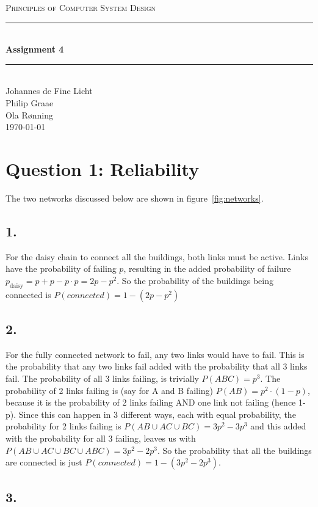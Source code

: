 \documentclass[12pt]{article}
\newcommand{\HRule}{\rule{\linewidth}{0.5mm}}
\begin{document}
\begin{center}
\textsc{\LARGE Principles of Computer System Design}\\[0.3cm] %
\HRule \\[0.4cm]
{ \huge \bfseries Assignment 4}
\HRule \\[0.4cm]
\large
Johannes de Fine Licht
\\Philip Graae
\\Ola Rønning
\\\today
\end{center}

\section*{Question 1: Reliability}

The two networks discussed below are shown in figure~\ref{fig:networks}.

\subsection*{1.}

For the daisy chain to connect all the buildings, both links must be active. Links have the probability of failing $p$, resulting in the added probability of failure $p_\text{daisy} = p + p - p\cdot p = 2p - p^2$. So the probability of the buildings being connected is $P(connected) = 1 - (2p - p^2)$

\subsection*{2.}

For the fully connected network to fail, any two links would have to fail. This is the probability that any two links fail added with the probability that all 3 links fail. The probability of all 3 links failing, is trivially $P(ABC) = p^{3}$. The probability of 2 links failing is (say for A and B failing) $P(AB) = p^{2}\cdot(1-p)$, because it is the probability of 2 links failing AND one link not failing (hence 1-p). Since this can happen in 3 different ways, each with equal probability, the probability for 2 links failing is $P(AB \cup AC \cup BC) = 3p^2 - 3p^3$ and this added with the probability for all 3 failing, leaves us with $P(AB \cup AC \cup BC \cup ABC) = 3p^2 - 2p^3$. So the probability that all the buildings are connected is just $P(connected) = 1 - (3p^2 - 2p^3)$.

\subsection*{3.}
\end{document}
